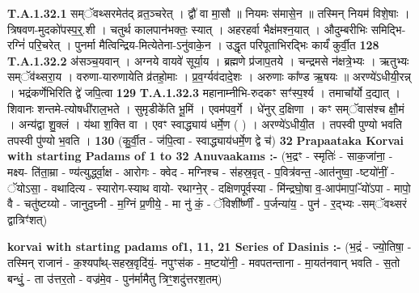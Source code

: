 \documentclass[17pt]{extarticle}
\begin{document}
                                \textbf{ T.A.1.32.1} \newline
                  सम्ॅवथ्सरमेत॑द् व्रत॒ञ्चरेत् । द्वौ॑ वा मा॒सौ ॥ नियमः स॑मासे॒न ॥ तस्मिन् नियम॑ विशे॒षाः । त्रिषवण-मुदको॑पस्प॒र्॒.शी । चतुर्थ कालपान॑भक्तः॒ स्यात् । अहरहर्वा भैक्ष॑मश्न॒यात् ।  औदुम्बरीभिः समिद्भि-रग्निं॑ परि॒चरेत् ।  पुनर्मा मैत्विन्द्रिय-मित्येतेना-ऽनु॑वाके॒न ।  उद्धृत परिपूताभिरद्भिः कार्यं॑ कुर्वी॒त \textbf{ 128} \newline
                  \newline
                                                                  \textbf{ T.A.1.32.2} \newline
                  अ॑सञ्च॒यवान् । अग्नये वायवे॑ सूर्या॒य । ब्रह्मणे प्र॑जाप॒तये । चन्द्रमसे न॑क्षत्रे॒भ्यः । ऋतुभ्यः सम्ॅव॑थ्सरा॒य । वरुणा-यारुणायेति व्र॑तहो॒माः । प्र॒व॒र्ग्यव॑दादे॒शः । अरुणाः का᳚ण्ड ऋ॒षयः ॥ अरण्ये॑ऽधीयी॒रन्न् । भद्रंकर्णेभिरिति द्वे॑ जपि॒त्वा \textbf{ 129} \newline
                  \newline
                                                                  \textbf{ T.A.1.32.3} \newline
                  महानाम्नीभि-रुदकꣳ सꣳ॑स्प॒र्श्य । तमाचा᳚र्यो द॒द्यात् । शिवानः शन्तमे-त्योषधी॑राल॒भते । सुमृडीके॑ति भू॒मिं । एवम॑पव॒र्गे ।  धे॑नुर् द॒क्षिणा । कꣳ सम्ॅवास॑श्च क्षौ॒मं । अन्य॑द्वा शु॒क्लं । य॑था श॒क्ति वा । एवꣳ स्वाद्ध्याय॑ धर्मे॒ण ( ) । अरण्ये॑ऽधीयी॒त । तपस्वी पुण्यो भवति तपस्वी पु॑ण्यो भ॒वति । \textbf{ 130} \newline
                  \newline
                                                        (कु॒र्वी॒त - ज॑पि॒त्वा - स्वाद्ध्याय॑धर्मे॒ण द्वे च॑) \textbf{32} \newline \newline
\textbf{Prapaataka Korvai with starting Padams of 1 to 32 Anuvaakams :-} \newline
(भ॒द्रꣳ - स्मृतिः॑ - साक॒जांना॒ - मक्ष्य- ति॑ता॒म्रा - ण्य॑त्युर्द्ध्वा॒क्ष - आरोगः - क्वेद - मग्निश्च - स॑हस्र॒वृत् - प॒वित्र॑वन्त॒ -आत॑नुष्वा॒ -ष्टयो॑नीं॒ - ॅयोऽसा॒ - वथादित्य - स्यारोग-स्याथ वायो- रथाग्ने॒र् - दक्षिणपूर्वस्या - मि॑न्द्रघो॒षा व॒-आप॑मापां॒-ॅयो॑ऽपा - मापो॒ वै - चतु॑ष्टय्यो - जानुद॒घ्नी - म॒ग्निं प्र॒णीये॒ - मा नु॑ कं॒ - ॅविशी᳚र्ष्णीं - प॒र्जन्या॑य॒ - पुन॑ - र॒द्भ्यः -सम्ॅवथ्सरं द्वात्रिꣳ॑शत्) \newline

\textbf{korvai with starting padams of1, 11, 21 Series of Dasinis :-} \newline
(भ॒द्रं - ज्यो॒तिषा॒ - तस्मिन् राजानं - क॒श्यपा᳚थ्-सहस्र॒वृदि॑यं॒- नपुꣳस॑क - म॒ष्टयो॑नी॒ - मवपतन्ताना - मा॒यत॑नवान् भवति - स॒तो बन्धुं॒ - ता उ॑त्तर॒तो - वज्र॑मे॒व - पुन॑र्मामैतु त्रिꣳ॒॒शदु॑त्तरश॒तम्) \newline
\end{document}

